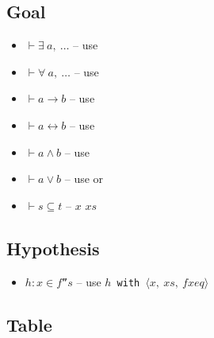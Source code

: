 \documentclass[a4paper]{article}
\begin{document}
\subsection*{Goal}

\begin{itemize}
    \item $\vdash \exists\ a,\ \dots$ -- use \use
    \item $\vdash \forall\ a,\ \dots$ -- use \intro
    \item $\vdash a \to b$ -- use \intro
    \item $\vdash a \leftrightarrow b$ -- use \constructor
    \item $\vdash a \wedge b$ -- use \constructor
    \item $\vdash a \vee b$ -- use \lleft or \rright
    \item $\vdash s \subseteq t$ -- \intro $x$ $xs$
\end{itemize}

\subsection*{Hypothesis}

\begin{itemize}
    \item \texttt{$h : x \in f$''$s$} -- use \texttt{\rcases $h$ with $\langle x,\ xs,\ fxeq \rangle$}
\end{itemize}

\subsection*{Table}
\end{document}
